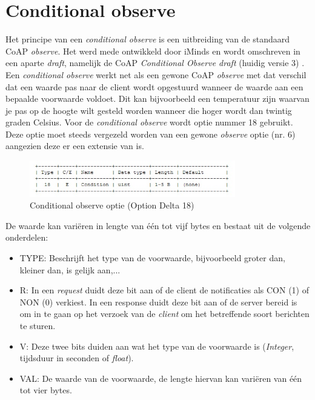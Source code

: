 \section{Conditional observe}

Het principe van een \textit{conditional observe} is een uitbreiding van de standaard CoAP \textit{observe}. Het werd mede ontwikkeld door iMinds en wordt omschreven in een aparte \textit{draft}, namelijk de CoAP \textit{Conditional Observe draft} (huidig versie 3) \cite{coapConditionalObserveDraft}.\\

Een \textit{conditional observe} werkt net als een gewone CoAP \textit{observe} met dat verschil dat een waarde pas naar de client wordt opgestuurd wanneer de waarde aan een bepaalde voorwaarde voldoet. Dit kan bijvoorbeeld een temperatuur zijn waarvan je pas op de hoogte wilt gesteld worden wanneer die hoger wordt dan twintig graden Celsius.
Voor de \textit{conditional observe} wordt optie nummer 18 gebruikt. Deze optie moet steeds vergezeld worden van een gewone \textit{observe} optie (nr. 6) aangezien deze er een extensie van is.

\begin{figure}[h!]
\centering
\includegraphics[width=0.8\textwidth]{fig/conditional}
\caption{Conditional observe optie (Option Delta 18)}
\end{figure}

De waarde kan vari\"{e}ren in lengte van \'{e}\'{e}n tot vijf bytes en bestaat uit de volgende onderdelen:
\begin{itemize}
\item TYPE: Beschrijft het type van de voorwaarde, bijvoorbeeld groter dan, kleiner dan, is gelijk aan,...
\item R: In een \textit{request} duidt deze bit aan of de client de notificaties als CON (1) of NON (0) verkiest. In een response duidt deze bit aan of de server bereid is om in te gaan op het verzoek van de \textit{client} om het betreffende soort berichten te sturen.
\item V: Deze twee bits duiden aan wat het type van de voorwaarde is (\textit{Integer}, tijdsduur in seconden of \textit{float}).
\item VAL: De waarde van de voorwaarde, de lengte hiervan kan vari\"{e}ren van \'{e}\'{e}n tot vier bytes.
\end{itemize}

